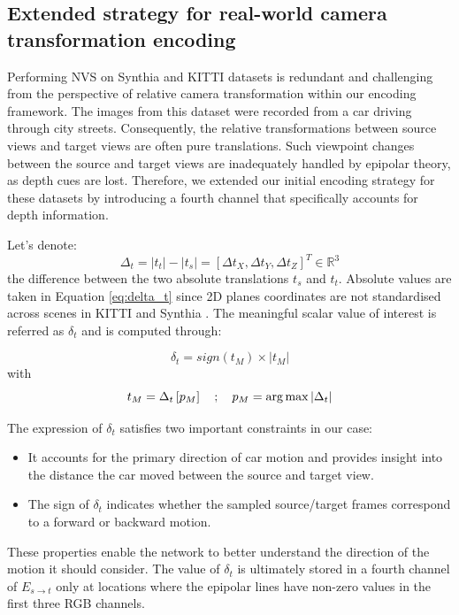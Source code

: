 \subsection{Extended strategy for real-world camera transformation encoding}

Performing \ac{NVS} on Synthia \citep{ros2016synthia} and KITTI \citep{geiger2012we} datasets is redundant and challenging from the perspective of relative camera transformation within our encoding framework. The images from this dataset were recorded from a car driving through city streets. Consequently, the relative transformations between source views and target views are often pure translations. Such viewpoint changes between the source and target views are inadequately handled by epipolar theory, as depth cues are lost. Therefore, we extended our initial encoding strategy for these datasets by introducing a fourth channel that specifically accounts for depth information.

Let's denote:
\begin{equation}
    \Delta_{t}= |t_{t}| - |t_{s}| = \left[\Delta t_{X},\Delta t_{Y},\Delta t_{Z} \right]^{T} \in \mathbb{R}^3
    \label{eq:delta_t}
\end{equation}
the difference between the two absolute translations $t_s$ and $t_t$. Absolute values are taken in Equation \eqref{eq:delta_t} since 2D planes coordinates are not standardised across scenes in KITTI \citep{geiger2012we} and Synthia \citep{ros2016synthia}. The meaningful scalar value of interest is referred as $\delta_{t}$ and is computed through:
 
 \begin{equation}
 \label{eq:2}
     \delta_{t} = sign(t_{M}) \times| t_{M} |
 \end{equation}
 with 
 \begin{equation}
    t_{M} = \Delta_{t}\left[p_{M}\right] \quad ; \quad p_{M}= \argmax|\Delta_{t}|
\end{equation}

The expression of $\delta_{t}$ satisfies two important constraints in our case: 

\begin{itemize}
    \item It accounts for the primary direction of car motion and provides insight into the distance the car moved between the source and target view.
    \item The sign of $\delta_{t}$ indicates whether the sampled source/target frames correspond to a forward or backward motion.  
\end{itemize}
These properties enable the network to better understand the direction of the motion it should consider. The value of  $\delta_{t}$ is ultimately stored in a fourth channel of $E_{s\xrightarrow{}t}$ only at locations where the epipolar lines have non-zero values in the first three RGB channels. 

